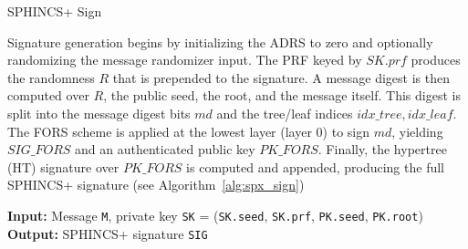 \begin{subsection}{SPHINCS+ Sign}

Signature generation begins by initializing the ADRS to zero and optionally randomizing the message randomizer input. The PRF keyed by \(\mathit{SK}.\mathit{prf}\) produces the randomness \(R\) that is prepended to the signature. A message digest is then computed over \(R\), the public seed, the root, and the message itself. This digest is split into the message digest bits \(\mathit{md}\) and the tree/leaf indices \(\mathit{idx\_tree},\mathit{idx\_leaf}\). The FORS scheme is applied at the lowest layer (layer 0) to sign \(\mathit{md}\), yielding \(\mathit{SIG\_FORS}\) and an authenticated public key \(\mathit{PK\_FORS}\). Finally, the hypertree (HT) signature over \(\mathit{PK\_FORS}\) is computed and appended, producing the full SPHINCS+ signature (see Algorithm~\ref{alg:spx_sign})

\begin{algorithm}
    \caption{spx\_sign -- Generating a SPHINCS+ signature}
    \label{alg:spx_sign}
    \textbf{Input:} Message \texttt{M}, private key \texttt{SK} = (\texttt{SK.seed}, \texttt{SK.prf}, \texttt{PK.seed}, \texttt{PK.root}) \\
    \textbf{Output:} SPHINCS+ signature \texttt{SIG}

    \vspace{0.2cm}


\end{algorithm}
\end{subsection}

